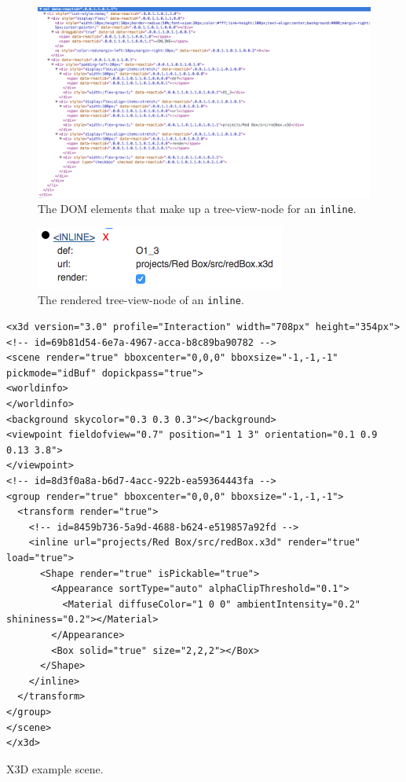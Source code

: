 \begin{figure}
  \centering
  \includegraphics[width=\textwidth]{../assets/treeview-node-dom.png}
  \caption{The DOM elements that make up a tree-view-node for an \texttt{inline}.}
  \label{fig:tree-view-node-dom}
\end{figure}

\begin{figure}
  \centering
  \includegraphics[width=.5\textwidth]{../assets/tree-view-node-rendered.png}
  \caption{The rendered tree-view-node of an \texttt{inline}.}
  \label{fig:tree-view-node-rendered}
\end{figure}

\begin{listing}
  \begin{verbatim}
<x3d version="3.0" profile="Interaction" width="708px" height="354px">
<!-- id=69b81d54-6e7a-4967-acca-b8c89ba90782 -->
<scene render="true" bboxcenter="0,0,0" bboxsize="-1,-1,-1" pickmode="idBuf" dopickpass="true">
<worldinfo>
</worldinfo>
<background skycolor="0.3 0.3 0.3"></background>
<viewpoint fieldofview="0.7" position="1 1 3" orientation="0.1 0.9 0.13 3.8">
</viewpoint>
<!-- id=8d3f0a8a-b6d7-4acc-922b-ea59364443fa -->
<group render="true" bboxcenter="0,0,0" bboxsize="-1,-1,-1">
  <transform render="true">
    <!-- id=8459b736-5a9d-4688-b624-e519857a92fd -->
    <inline url="projects/Red Box/src/redBox.x3d" render="true" load="true">
      <Shape render="true" isPickable="true">
        <Appearance sortType="auto" alphaClipThreshold="0.1">
          <Material diffuseColor="1 0 0" ambientIntensity="0.2" shininess="0.2"></Material>
        </Appearance>
        <Box solid="true" size="2,2,2"></Box>
      </Shape>
    </inline>
  </transform>
</group>
</scene>
</x3d>
  \end{verbatim}
	\caption{X3D example scene.}
	\label{list:x3dscene}
\end{listing}

